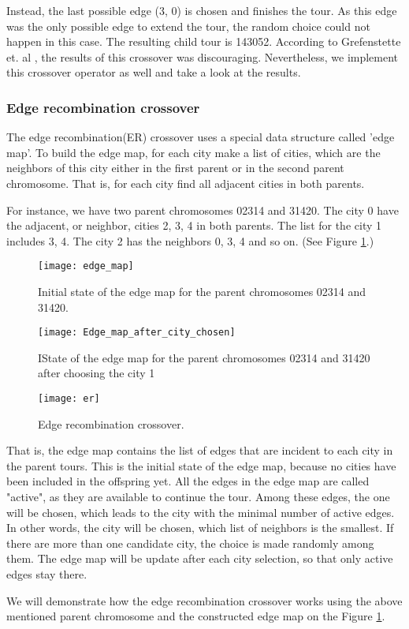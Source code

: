 \documentclass[a4paper, 12pt, headings=standardclasses]{scrartcl}
\begin{document}
Instead, the last possible edge (3, 0) is chosen and finishes the tour. As this edge was the only possible edge to extend the tour, the random choice could not happen in this case. The resulting child tour is 143052. According to Grefenstette et. al \cite{2}, the results of this crossover was discouraging. Nevertheless, we implement this crossover operator as well and take a look at the results.

\subsubsection{Edge recombination crossover}
The edge recombination(ER) crossover uses a special data structure called 'edge map'. To build the edge map, for each city make a list of cities, which are the neighbors of this city either in the first parent or in the second parent chromosome. That is, for each city find all adjacent cities in both parents. \par

For instance, we have two parent chromosomes 02314 and 31420. The city 0 have the adjacent, or neighbor, cities 2, 3, 4 in both parents. The list for the city 1 includes 3, 4. The city 2 has the neighbors 0, 3, 4 and so on. (See Figure \ref{edge_map}.) 

\begin{figure}[!ht]
	\centering
	\texttt{[image: edge\_map]}
	\caption{Initial state of the edge map for the parent chromosomes 02314 and 31420.}
	\label{edge_map}
\end{figure}

\begin{figure}[!ht]
	\centering
	\texttt{[image: Edge\_map\_after\_city\_chosen]}
	\caption{IState of the edge map for the parent chromosomes 02314 and 31420 after choosing the city 1}
	\label{Edge_map_after_city_chosen}
\end{figure}

\begin{figure}[!ht]
	\centering
	\texttt{[image: er]}
	\caption{Edge recombination crossover.}
	\label{er}
\end{figure}

 That is, the edge map contains the list of edges that are incident to each city in the parent tours. This is the initial state of the edge map, because no cities have been included in the offspring yet. All the edges in the edge map are called "active", as they are available to continue the tour. Among these edges, the one will be chosen, which leads to the city with the minimal number of active edges. In other words, the city will be chosen, which list of neighbors is the smallest. If there are more than one candidate city, the choice is made randomly among them. The edge map will be update after each city selection, so that only active edges stay there.\par
 We will demonstrate how the edge recombination crossover works using the above mentioned parent chromosome and the constructed edge map on the Figure \ref{edge_map}.
\end{document}
